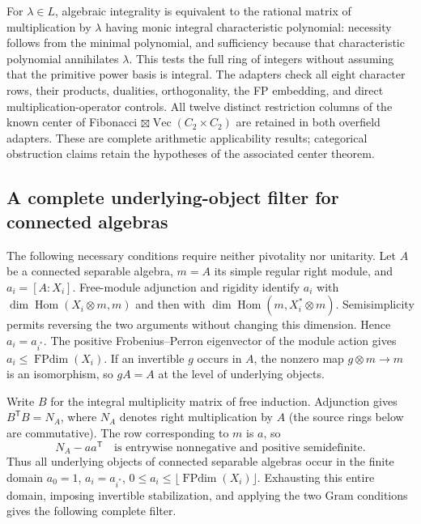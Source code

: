For $\lambda\in L$, algebraic integrality is equivalent to the rational
matrix of multiplication by $\lambda$ having monic integral characteristic
polynomial: necessity follows from the minimal polynomial, and sufficiency
because that characteristic polynomial annihilates $\lambda$.
This tests the full ring of integers without assuming that the primitive
power basis is integral. The adapters check all eight character rows,
their products, dualities, orthogonality, the FP embedding, and direct
multiplication-operator controls. All twelve distinct restriction columns
of the known center of Fibonacci $\boxtimes\operatorname{Vec}(C_2\times C_2)$
are retained in both overfield adapters. These are complete arithmetic
applicability results; categorical obstruction claims retain the
hypotheses of the associated center theorem.


\subsection{A complete underlying-object filter for connected algebras}

The following necessary conditions require neither pivotality nor unitarity.
Let $A$ be a connected separable algebra, $m=A$ its simple regular right
module, and $a_i=[A:X_i]$. Free-module adjunction and rigidity identify
$a_i$ with $\dim\operatorname{Hom}(X_i\otimes m,m)$ and then with
$\dim\operatorname{Hom}(m,X_i^*\otimes m)$. Semisimplicity permits reversing
the two arguments without changing this dimension. Hence $a_i=a_{i^*}$.
The positive Frobenius--Perron eigenvector of the module action gives
$a_i\leq\operatorname{FPdim}(X_i)$. If an invertible $g$ occurs in $A$,
the nonzero map $g\otimes m\longrightarrow m$ is an isomorphism, so
$gA=A$ at the level of underlying objects.

Write $B$ for the integral multiplicity matrix of free induction.
Adjunction gives $B^{\mathsf T}B=N_A$, where $N_A$ denotes right
multiplication by $A$ (the source rings below are commutative).
The row corresponding to $m$ is $a$, so
\[
 N_A-aa^{\mathsf T}\quad\text{is entrywise nonnegative and positive semidefinite.}
\]
Thus all underlying objects of connected separable algebras occur in the
finite domain $a_0=1$, $a_i=a_{i^*}$,
$0\leq a_i\leq\lfloor\operatorname{FPdim}(X_i)\rfloor$.
Exhausting this entire domain, imposing invertible stabilization, and
applying the two Gram conditions gives the following complete filter.

